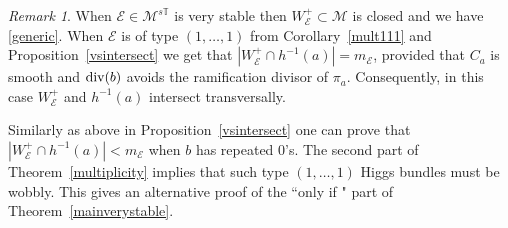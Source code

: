 \documentclass[12pt]{article}
\numberwithin{equation}{section}
\renewcommand{\div}{{\rm div}}
\newtheorem{theorem}{Theorem}
\theoremstyle{remark}
\newtheorem{remark}[theorem]{Remark}
\theoremstyle{definition}
\numberwithin{theorem}{section}
\def\beq{\begin{eqnarray}}
\def\eeq{\end{eqnarray}}
\def\calE{{\mathcal E}}
\def\M{{\mathcal{M}}}
\def\calA{{\mathcal{A}}}
\newcommand{\T}{{\mathbb{T}}}
\def\calO{{\mathcal O}}
\def\Z{\mathbb{Z}}
\renewcommand{\1}{\mathbbm{1}}
\begin{document}
\begin{remark}When $\calE\in \M^{s\T}$ is very stable then $W^+_\calE\subset \M$ is closed and we have \eqref{generic}. %
	When $\calE$ is of type $(1,\dots,1)$ from Corollary~\ref{mult111} and Proposition~\ref{vsintersect} we get that $|W^+_\calE\cap h^{-1}(a)|=m_\calE$, provided that $C_a$ is smooth and $\div(b)$ avoids the ramification divisor of $\pi_a$. Consequently, in this case $W^+_\calE$ and $h^{-1}(a)$ intersect transversally. 
	
	Similarly as above in Proposition~\ref{vsintersect} one can prove that $|W^+_\calE\cap h^{-1}(a)|<m_\calE$ when $b$ has repeated $0$'s. The second part of Theorem~\ref{multiplicity}  implies that such type $(1,\dots,1)$ Higgs bundles must be  wobbly. This gives an alternative proof of the ``only if " part of Theorem~\ref{mainverystable}.
\end{remark}


\end{document}
